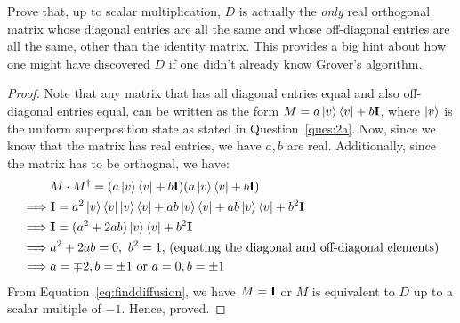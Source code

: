 \begin{solution}[label=ques:2b]
  \begin{question}
    Prove that, up to scalar multiplication, $D$ is actually the \textit{only}
real orthogonal matrix whose diagonal entries are all the same and whose
off-diagonal entries are all the same, other than the identity matrix.
This provides a big hint about how one might have discovered $D$ if one
didn't already know Grover's algorithm.
  \end{question}
  \tcblower{}
  \begin{proof}[Proof]
    Note that any matrix that has all diagonal entries equal and also off-diagonal entries equal, can be written as the form $M = a\ket{v}\bra{v} + b\mathbf{I}$, where $\ket{v}$ is the uniform superposition state as stated in Question~\ref{ques:2a}. Now, since we know that the matrix has real entries, we have $a, b$ are real. Additionally, since the matrix has to be orthognal, we have:
    \begin{equation}
      \begin{split}
        &M\cdot M^\dagger = (a\ket{v}\bra{v} + b\mathbf{I})(a\ket{v}\bra{v} + b\mathbf{I})\\
        \implies &\mathbf{I} = a^2\ket{v}\bra{v}\ket{v}\bra{v} + ab\ket{v}\bra{v} + ab\ket{v}\bra{v} + b^2\mathbf{I}\\
        \implies &\mathbf{I} = (a^2 + 2ab)\ket{v}\bra{v} + b^2\mathbf{I}\\
        \implies &a^2 + 2ab = 0,\ b^2 = 1\text{, (equating the diagonal and off-diagonal elements)}\\
        \implies &a = \mp 2, b = \pm 1\text{ or }a = 0, b = \pm 1
      \end{split}
      \label{eq:finddiffusion}
    \end{equation}
    From Equation~\ref{eq:finddiffusion}, we have $M = \mathbf{I}$ or $M$ is equivalent to $D$ up to a scalar multiple of $-1$. Hence, proved.
  \end{proof}
\end{solution}

